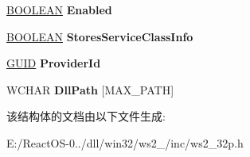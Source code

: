\begin{DoxyCompactItemize}
\item 
\mbox{\label{struct___n_s_c_a_t_a_l_o_g___e_n_t_r_y_ac1647b0800e976545e4895305a1b9deb}} 
\hyperlink{_processor_bind_8h_a112e3146cb38b6ee95e64d85842e380a}{B\+O\+O\+L\+E\+AN} {\bfseries Enabled}
\item 
\mbox{\label{struct___n_s_c_a_t_a_l_o_g___e_n_t_r_y_aacad38c65fea84143e189bf049542e23}} 
\hyperlink{_processor_bind_8h_a112e3146cb38b6ee95e64d85842e380a}{B\+O\+O\+L\+E\+AN} {\bfseries Stores\+Service\+Class\+Info}
\item 
\mbox{\label{struct___n_s_c_a_t_a_l_o_g___e_n_t_r_y_a2590830c39986ece9136c6e5e9f5094a}} 
\hyperlink{interface_g_u_i_d}{G\+U\+ID} {\bfseries Provider\+Id}
\item 
\mbox{\label{struct___n_s_c_a_t_a_l_o_g___e_n_t_r_y_a67e639f051efb4684d7be31e7cd368b8}} 
W\+C\+H\+AR {\bfseries Dll\+Path} \mbox{[}M\+A\+X\+\_\+\+P\+A\+TH\mbox{]}
\end{DoxyCompactItemize}


该结构体的文档由以下文件生成\+:\begin{DoxyCompactItemize}
\item 
E\+:/\+React\+O\+S-\/0../dll/win32/ws2\+\_/inc/ws2\+\_\+32p.\+h\end{DoxyCompactItemize}
